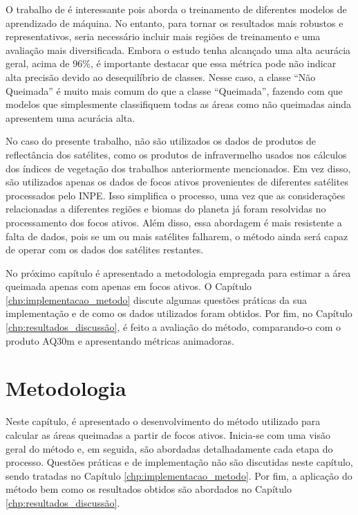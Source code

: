 \documentclass[cic,tc]{iiufrgs}
\begin{document}
O trabalho de \citet{dosclassificaccao} é interessante pois aborda o treinamento de diferentes modelos de aprendizado de máquina. No entanto, para tornar os resultados mais robustos e representativos, seria necessário incluir mais regiões de treinamento e uma avaliação mais diversificada. Embora o estudo tenha alcançado uma alta acurácia geral, acima de 96\%, é importante destacar que essa métrica pode não indicar alta precisão devido ao desequilíbrio de classes. Nesse caso, a classe ``Não Queimada'' é muito mais comum do que a classe ``Queimada'', fazendo com que modelos que simplesmente classifiquem todas as áreas como não queimadas ainda apresentem uma acurácia alta.

No caso do presente trabalho, não são utilizados os dados de produtos de reflectância dos satélites, como os produtos de infravermelho usados nos cálculos dos índices de vegetação dos trabalhos anteriormente mencionados. Em vez disso, são utilizados apenas os dados de focos ativos provenientes de diferentes satélites processados pelo INPE. Isso simplifica o processo, uma vez que as considerações relacionadas a diferentes regiões e biomas do planeta já foram resolvidas no processamento dos focos ativos. Além disso, essa abordagem é mais resistente a falta de dados, pois se um ou mais satélites falharem, o método ainda será capaz de operar com os dados dos satélites restantes. 

No próximo capítulo é apresentado a metodologia empregada para estimar a área queimada apenas com apenas em focos ativos. O Capítulo \ref{chp:implementacao_metodo} discute algumas questões práticas da sua implementação e de como os dados utilizados foram obtidos. Por fim, no Capítulo \ref{chp:resultados_discussão}, é feito a avaliação do método, comparando-o com o produto AQ30m e apresentando métricas animadoras.




\chapter{Metodologia}

Neste capítulo, é apresentado o desenvolvimento do método utilizado para calcular as áreas queimadas a partir de focos ativos. Inicia-se com uma visão geral do método e, em seguida, são abordadas detalhadamente cada etapa do processo. Questões práticas e de implementação não são discutidas neste capítulo, sendo tratadas no Capítulo \ref{chp:implementacao_metodo}. Por fim, a aplicação do método bem como os resultados obtidos são abordados no Capítulo \ref{chp:resultados_discussão}.
\end{document}
